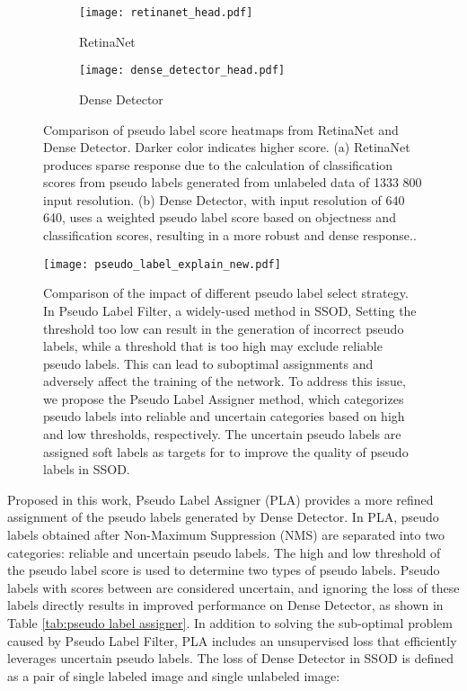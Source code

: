 \documentclass[10pt,twocolumn,letterpaper]{article}
\begin{document}
\begin{figure}[h]
    \centering \begin{subfigure}[b]{0.25\textwidth}
        \centering
        \label{Fig.detector_compare.1}
\texttt{[image: retinanet\_head.pdf]}
        \caption{RetinaNet}
    \end{subfigure}
\begin{subfigure}[b]{0.2\textwidth}
        \centering
        \label{Fig.detector_compare.2}
        \texttt{[image: dense\_detector\_head.pdf]}
        \caption{Dense Detector}
    \end{subfigure}
\caption{Comparison of pseudo label score heatmaps from RetinaNet and Dense Detector. Darker color indicates higher score. (a) RetinaNet produces sparse response due to the calculation of classification scores from pseudo labels generated from unlabeled data of 1333  800 input resolution. (b) Dense Detector, with input resolution of 640  640, uses a weighted pseudo label score based on objectness and classification scores, resulting in a more robust and dense response..}
\label{Fig.detector_compare}
\end{figure}

\begin{figure}[h]
    \centering \texttt{[image: pseudo\_label\_explain\_new.pdf]}
\caption{Comparison of the impact of different pseudo label select strategy. In Pseudo Label Filter, a widely-used method in SSOD\cite{liu2021unbiased,xu2021end}, Setting the threshold too low can result in the generation of incorrect pseudo labels, while a threshold that is too high  may exclude reliable pseudo labels. This can lead to suboptimal assignments and adversely affect the training of the network. To address this issue, we propose the Pseudo Label Assigner method, which categorizes pseudo labels into reliable and uncertain categories based on high and low thresholds, respectively. The uncertain pseudo labels are assigned soft labels as targets for  to improve the quality of pseudo labels in SSOD.}
\label{Fig.pseudo_label_assigner}
\end{figure}
Proposed in this work, Pseudo Label Assigner (PLA) provides a more refined assignment of the pseudo labels generated by Dense Detector. In PLA, pseudo labels obtained after Non-Maximum Suppression (NMS) are separated into two categories: reliable and uncertain pseudo labels. The high and low threshold  of the pseudo label score is used to determine two types of pseudo labels. Pseudo labels with scores between  are considered uncertain, and ignoring the loss of these labels directly results in improved performance on Dense Detector, as shown in Table \ref{tab:pseudo label assigner}. In addition to solving the sub-optimal problem caused by Pseudo Label Filter, PLA includes an unsupervised loss that efficiently leverages uncertain pseudo labels. The loss of Dense Detector in  SSOD is defined as a pair of single labeled image and single unlabeled image:
\end{document}
